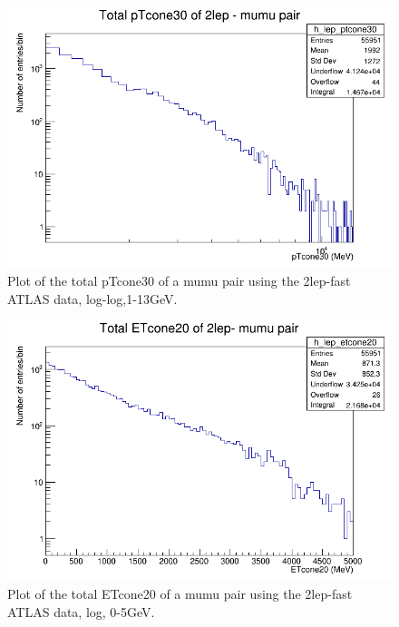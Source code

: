 \begin{figure}[h!]
    \centering
    \includegraphics[width=0.85\linewidth]{plots/16-02-2021/2lep-fast_mumu-pair_ptcone30(total)_log-log_1-13GeV_16-02-2021_11-45}
    \caption{Plot of the total pTcone30 of a mumu pair using the 2lep-fast ATLAS data, log-log,1-13GeV. }\label{fig:2lep-fast_mumu-pair_ptcone30(total)_log-log_1-13GeV_16-02-2021_11-45.png}
\end{figure}


\begin{figure}[h!]
    \centering
    \includegraphics[width=0.85\linewidth]{plots/16-02-2021/2lep-fast_mumu-pair_etcone20(total)_log-entries_0-5GeV_16-02-2021_11-31}
    \caption{Plot of the total ETcone20 of a mumu pair using the 2lep-fast ATLAS data, log, 0-5GeV. }\label{fig:2lep-fast_mumu-pair_etcone20(total)_log-entries_0-5GeV_16-02-2021_11-31}
\end{figure}

